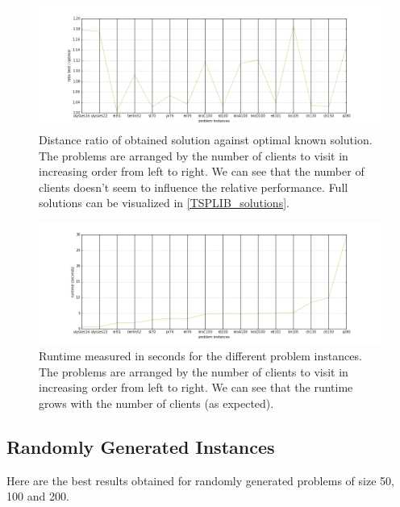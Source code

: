 \documentclass{article} %
\begin{document}
\begin{figure}[!htb]
	\begin{center}
	\includegraphics[scale=0.4]{figs/ratios}
	\caption{\small Distance ratio of obtained solution against optimal known solution. The problems are arranged by the number of clients to visit in increasing order from left to right. We can see that the number of clients doesn't seem to influence the relative performance. Full solutions can be visualized in \cref{TSPLIB_solutions}.}
	\end{center}
\end{figure}



\begin{figure}[!htb]
\begin{center}
\includegraphics[scale=0.4]{figs/runtimes}
\caption{\small Runtime measured in seconds for the different problem instances. The problems are arranged by the number of clients to visit in increasing order from left to right. We can see that the runtime grows with the number of clients (as expected).}
\end{center}
\end{figure}



\newpage
\subsection{Randomly Generated Instances}

Here are the best results obtained for randomly generated problems of size 50, 100 and 200.
\end{document}
